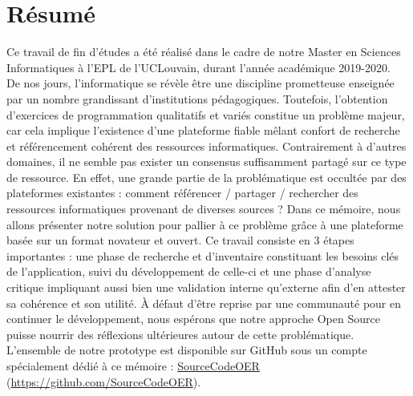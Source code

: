 \chapter*{Résumé}

Ce travail de fin d'études a été réalisé dans le cadre de notre Master en Sciences Informatiques à l'EPL de l'UCLouvain, durant l'année académique 2019-2020.\\

De nos jours, l’informatique se révèle être une discipline prometteuse enseignée par un nombre grandissant d’institutions pédagogiques.
Toutefois, l'obtention d’exercices de programmation qualitatifs et variés constitue un problème majeur, car cela implique l'existence d'une plateforme fiable mêlant confort de recherche et référencement cohérent des ressources informatiques.
Contrairement à d'autres domaines, il ne semble pas exister un consensus suffisamment partagé sur ce type de ressource. En effet, une grande partie de la problématique est occultée par des plateformes existantes : comment référencer / partager / rechercher des ressources informatiques provenant de diverses sources ?
Dans ce mémoire, nous allons présenter notre solution pour pallier à ce problème grâce à une plateforme basée sur un format novateur et ouvert.
Ce travail consiste en 3 étapes importantes : une phase de recherche et d'inventaire constituant les besoins clés de l'application, suivi du développement de celle-ci et une phase d'analyse critique impliquant aussi bien une validation interne qu'externe afin d'en attester sa cohérence et son utilité.
À défaut d'être reprise par une communauté pour en continuer le développement, nous espérons que notre approche Open Source puisse nourrir des réflexions ultérieures autour de cette problématique.\\

L'ensemble de notre prototype est disponible sur GitHub sous un compte spécialement dédié à ce mémoire : 
\href{https://github.com/SourceCodeOER}{SourceCodeOER} (\href{https://github.com/SourceCodeOER}{https://github.com/SourceCodeOER}).

\iffalse

